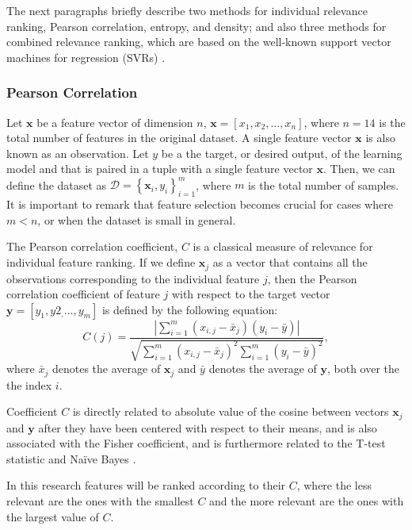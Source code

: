 \documentclass{bmcart}
\begin{document}
The next paragraphs briefly describe two methods for individual relevance
ranking, Pearson correlation, entropy, and density; and also three methods for combined
relevance ranking, which are based on the well-known 
support vector machines for regression (SVRs) \cite{rivas2014algorithm}.

\subsubsection*{Pearson Correlation}

Let $\mathbf{x}$ be a feature vector of dimension $n$, $\mathbf{x}=[x_1, x_2,
\dots, x_n]$, where $n=14$ is the total number of features in the original
dataset. A single feature vector $\mathbf{x}$ is also known as an observation. 
Let $y$ be a the target, or desired output, of the learning model
and that is paired in a tuple with a single feature vector $\mathbf{x}$. Then,
we can define the dataset as $\mathcal{D}=\left\{ \mathbf{x}_i, y_i
\right\}_{i=1}^m$, where $m$ is the total number of samples. It is important to
remark that feature selection becomes crucial for cases where $m<n$, or when
the dataset is small in general.

The Pearson correlation coefficient, $C$ is a classical measure of
relevance for individual feature ranking. If we define $\mathbf{x}_j$ as a
vector that contains all the observations corresponding to the individual
feature $j$, then the Pearson correlation coefficient of feature $j$ with
respect to the target vector $\mathbf{y}=[y_1, y2_, \dots, y_m]$ is defined 
by the following equation:
\begin{equation}
C(j) = \frac{\left| \sum_{i=1}^m (x_{i,j} - \bar{x}_j) (y_i -\bar{y})
\right|}{\sqrt{\sum_{i=1}^m (x_{i,j} - \bar{x}_j)^2 \sum_{i=1}^m(y_i
-\bar{y})^2}} , 
\end{equation}
where $\bar{x}_j$ denotes the average of $\mathbf{x}_j$ and
$\bar{y}$ denotes the average of $\mathbf{y}$, both over the the index $i$.

Coefficient $C$ is directly related to absolute value of the cosine between
vectors $\mathbf{x}_j$ and $\mathbf{y}$ after they have been centered with
respect to their means, and is also associated with the Fisher
coefficient, and is furthermore related to the T-test statistic and Na\"{i}ve
Bayes \cite{guyon2008feature}.

In this research features will be ranked according to their $C$, where the
less relevant are the ones with the smallest $C$ and the more relevant are
the ones with the largest value of $C$.
\end{document}
